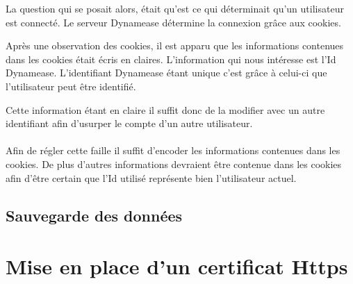 La question qui se posait alors, était qu'est ce qui déterminait qu'un utilisateur est connecté. Le serveur Dynamease détermine la connexion grâce aux cookies.

Après une observation des cookies, il est apparu que les informations contenues dans les cookies était écris en claires. L'information qui nous intéresse est l'Id Dynamease. L'identifiant Dynamease étant unique c'est grâce à celui-ci que l'utilisateur peut être identifié.

Cette information étant en claire il suffit donc de la modifier avec un autre identifiant afin d'usurper le compte d'un autre utilisateur.
\\\\

Afin de régler cette faille il suffit d'encoder les informations contenues dans les cookies. De plus d'autres informations devraient être contenue dans les cookies afin d'être certain que l'Id utilisé représente bien l'utilisateur actuel. 

\subsection{Sauvegarde des données}

\section{Mise en place d'un certificat Https}